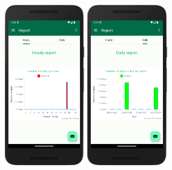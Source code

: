 \documentclass{article}
\begin{document}
\begin{figure}[H]
    \centering
    \includegraphics[width=0.31\textwidth]{res/img/ops}
    \hspace{1cm}
    \includegraphics[width=0.31\textwidth]{res/img/oneAndOnlyPicture}
    \captionsetup{labelformat=empty} %
    \caption{} %
    \label{fig:thePicture}
    \captionsetup{labelformat=default} %
\end{figure}

\newpage


%
%
%
\end{document}
